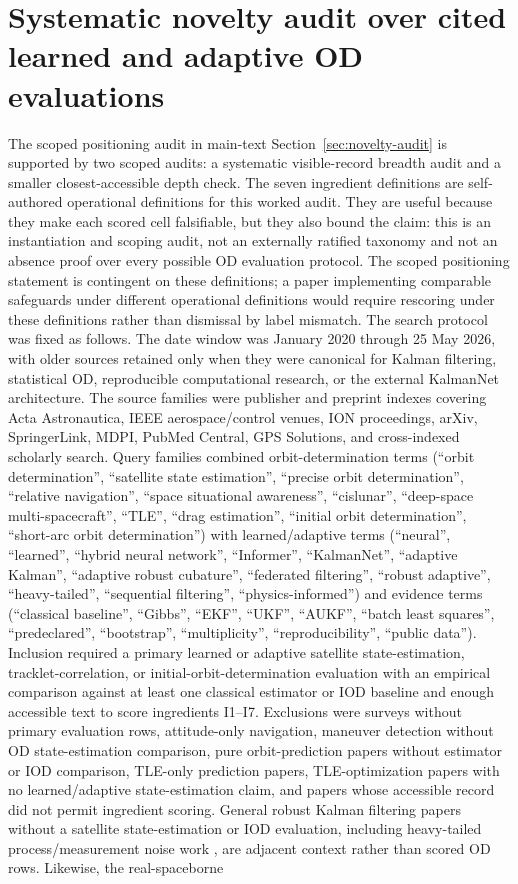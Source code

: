 \documentclass{article}
\begin{document}
\section{Systematic novelty audit over cited learned and adaptive OD evaluations}
\label{app:novelty-audit-systematic}
The scoped positioning audit in main-text Section~\ref{sec:novelty-audit} is supported by two scoped audits: a systematic visible-record breadth audit and a smaller closest-accessible depth check. The seven ingredient definitions are self-authored operational definitions for this worked audit. They are useful because they make each scored cell falsifiable, but they also bound the claim: this is an instantiation and scoping audit, not an externally ratified taxonomy and not an absence proof over every possible OD evaluation protocol. The scoped positioning statement is contingent on these definitions; a paper implementing comparable safeguards under different operational definitions would require rescoring under these definitions rather than dismissal by label mismatch. The search protocol was fixed as follows. The date window was January 2020 through 25 May 2026, with older sources retained only when they were canonical for Kalman filtering, statistical OD, reproducible computational research, or the external KalmanNet architecture. The source families were publisher and preprint indexes covering Acta Astronautica, IEEE aerospace/control venues, ION proceedings, arXiv, SpringerLink, MDPI, PubMed Central, GPS Solutions, and cross-indexed scholarly search. Query families combined orbit-determination terms (``orbit determination'', ``satellite state estimation'', ``precise orbit determination'', ``relative navigation'', ``space situational awareness'', ``cislunar'', ``deep-space multi-spacecraft'', ``TLE'', ``drag estimation'', ``initial orbit determination'', ``short-arc orbit determination'') with learned/adaptive terms (``neural'', ``learned'', ``hybrid neural network'', ``Informer'', ``KalmanNet'', ``adaptive Kalman'', ``adaptive robust cubature'', ``federated filtering'', ``robust adaptive'', ``heavy-tailed'', ``sequential filtering'', ``physics-informed'') and evidence terms (``classical baseline'', ``Gibbs'', ``EKF'', ``UKF'', ``AUKF'', ``batch least squares'', ``predeclared'', ``bootstrap'', ``multiplicity'', ``reproducibility'', ``public data''). Inclusion required a primary learned or adaptive satellite state-estimation, tracklet-correlation, or initial-orbit-determination evaluation with an empirical comparison against at least one classical estimator or IOD baseline and enough accessible text to score ingredients I1--I7. Exclusions were surveys without primary evaluation rows, attitude-only navigation, maneuver detection without OD state-estimation comparison, pure orbit-prediction papers without estimator or IOD comparison, TLE-only prediction papers, TLE-optimization papers with no learned/adaptive state-estimation claim, and papers whose accessible record did not permit ingredient scoring. General robust Kalman filtering papers without a satellite state-estimation or IOD evaluation, including heavy-tailed process/measurement noise work \cite{wang2026heavytailedkf}, are adjacent context rather than scored OD rows. Likewise, the real-spaceborne 
\end{document}
